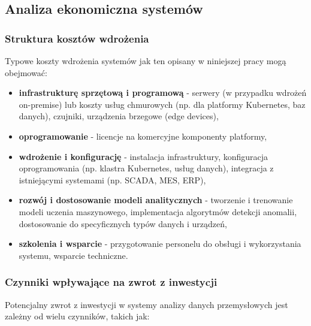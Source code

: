 \subsection{Analiza ekonomiczna systemów}
\label{subsec:analiza_ekonomiczna}

\subsubsection{Struktura kosztów wdrożenia}
\label{subsubsec:struktura_kosztow}

Typowe koszty wdrożenia systemów jak ten opisany w niniejszej pracy mogą obejmować:

\vspace{0.3em}

\begin{itemize}
    \item \textbf{infrastrukturę sprzętową i programową} - serwery (w przypadku wdrożeń on-premise) lub koszty usług chmurowych (np. dla platformy Kubernetes, baz danych), czujniki, urządzenia brzegowe (edge devices),
    \item \textbf{oprogramowanie} - licencje na komercyjne komponenty platformy,
    \item \textbf{wdrożenie i konfigurację} - instalacja infrastruktury, konfiguracja oprogramowania (np. klastra Kubernetes, usług danych), integracja z istniejącymi systemami (np. SCADA, MES, ERP),
    \item \textbf{rozwój i dostosowanie modeli analitycznych} - tworzenie i trenowanie modeli uczenia maszynowego, implementacja algorytmów detekcji anomalii, dostosowanie do specyficznych typów danych i urządzeń,
    \item \textbf{szkolenia i wsparcie} - przygotowanie personelu do obsługi i wykorzystania systemu, wsparcie techniczne.
\end{itemize}

\subsubsection{Czynniki wpływające na zwrot z inwestycji}
\label{subsubsec:analiza_roi}

Potencjalny zwrot z inwestycji w systemy analizy danych przemysłowych jest zależny od wielu czynników, takich jak:

\vspace{0.3em}

